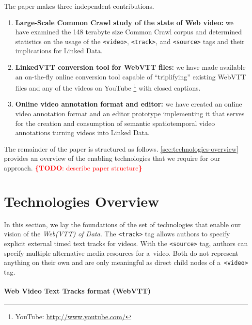 \documentclass{sig-alternate}
\newcommand{\inlinelistingsize}{\fontsize{8pt}{11pt}}
\let\oldurl\url
\renewcommand{\url}[1]{\inlinelistingsize\oldurl{#1}}
\newcommand{\todo}[1]{\noindent\textcolor{red}{{\bf \{TODO}: #1{\bf \}}}}
\begin{document}
The paper makes three independent contributions.

\begin{enumerate}[label=\textit{\roman*)},leftmargin=*]
  \item \textbf{Large-Scale Common Crawl study of the state of Web video:}
    we have examined the 148 terabyte size Common Crawl corpus
    and determined statistics on the usage of the \texttt{<video>},
    \texttt{<track>}, and \texttt{<source>} tags
    and their implications for Linked Data.
  \item \textbf{LinkedVTT conversion tool for WebVTT files:}
  we have made available an on-the-fly online conversion tool
  capable of ``triplifying'' existing WebVTT files
  and any of the videos on YouTube%
  \footnote{YouTube: \url{http://www.youtube.com/}} with closed captions.
  \item \textbf{Online video annotation format and editor:} we have created an
  online video annotation format and an editor prototype implementing it
  that serves for the creation
  and consumption of semantic spatiotemporal video annotations
  turning videos into Linked Data.
\end{enumerate}

The remainder of the paper is structured as follows.
\autoref{sec:technologies-overview} provides an overview
of the enabling technologies that we require for our approach.
\todo{describe paper structure}

\section{Technologies Overview}
\label{sec:technologies-overview}

In this section, we lay the foundations of the set of technologies
that enable our vision of the \emph{Web(VTT) of Data}.
The \texttt{<track>} tag allows authors to specify explicit
external timed text tracks for videos.
With the \texttt{<source>} tag, authors can specify
multiple alternative media resources for a~video.
Both do not represent anything on their own
and are only meaningful as direct child nodes of a~\texttt{<video>} tag.

\paragraph{Web Video Text Tracks format (WebVTT)}
\end{document}
